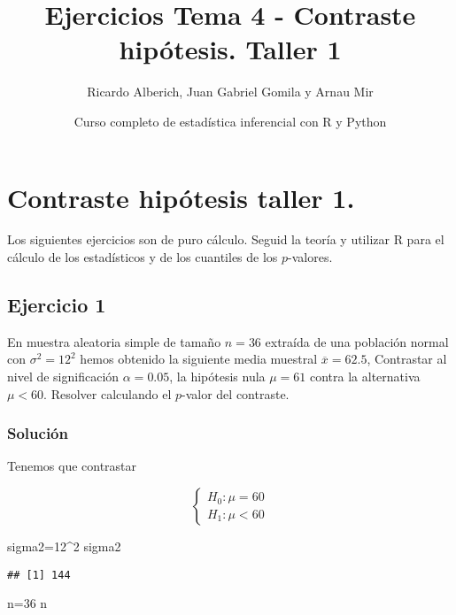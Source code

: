 \documentclass[
]{article}
\title{Ejercicios Tema 4 - Contraste hipótesis. Taller 1}
\author{Ricardo Alberich, Juan Gabriel Gomila y Arnau Mir}
\date{Curso completo de estadística inferencial con R y Python}
\newenvironment{Shaded}{\begin{snugshade}}{\end{snugshade}}
\newcommand{\DecValTok}[1]{\textcolor[rgb]{0.00,0.00,0.81}{#1}}
\newcommand{\NormalTok}[1]{#1}
\newcommand{\OperatorTok}[1]{\textcolor[rgb]{0.81,0.36,0.00}{\textbf{#1}}}
\begin{document}
\maketitle

{
\hypersetup{linkcolor=blue}
\setcounter{tocdepth}{2}
\tableofcontents
}
\hypertarget{contraste-hipuxf3tesis-taller-1.}{%
\section{Contraste hipótesis taller
1.}\label{contraste-hipuxf3tesis-taller-1.}}

Los siguientes ejercicios son de puro cálculo. Seguid la teoría y
utilizar R para el cálculo de los estadísticos y de los cuantiles de los
\(p\)-valores.

\hypertarget{ejercicio-1}{%
\subsection{Ejercicio 1}\label{ejercicio-1}}

En muestra aleatoria simple de tamaño \(n=36\) extraída de una población
normal con \(\sigma^2=12^2\) hemos obtenido la siguiente media muestral
\(\overline{x}=62.5\), Contrastar al nivel de significación
\(\alpha=0.05\), la hipótesis nula \(\mu=61\) contra la alternativa
\(\mu<60\). Resolver calculando el \(p\)-valor del contraste.

\hypertarget{soluciuxf3n}{%
\subsubsection{Solución}\label{soluciuxf3n}}

Tenemos que contrastar

\[
\left\{
\begin{array}{ll}
H_{0}:\mu=60\\
H_{1}:\mu<60
\end{array}
\right.
\]

\begin{Shaded}
\begin{Highlighting}[]
\NormalTok{sigma2=}\DecValTok{12}\OperatorTok{^}\DecValTok{2}
\NormalTok{sigma2}
\end{Highlighting}
\end{Shaded}

\begin{verbatim}
## [1] 144
\end{verbatim}

\begin{Shaded}
\begin{Highlighting}[]
\NormalTok{n=}\DecValTok{36}
\NormalTok{n}
\end{Highlighting}
\end{Shaded}
\end{document}
